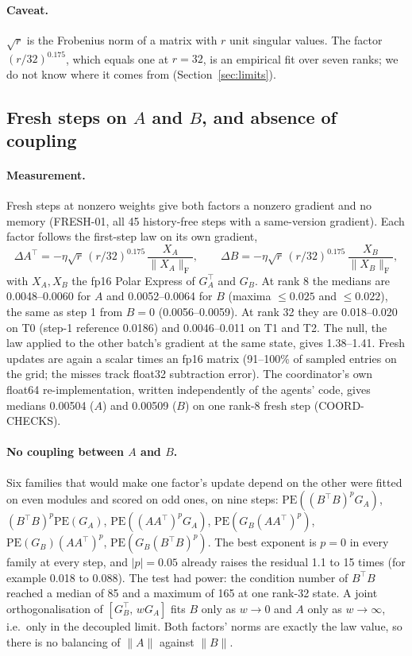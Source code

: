 \documentclass[11pt]{article}
\newcommand{\fro}{\mathrm{F}}
\newcommand{\PE}{\mathrm{PE}}
\begin{document}
\paragraph{Caveat.} $\sqrt r$ is the Frobenius norm of a matrix with $r$ unit singular values. The
factor $(r/32)^{0.175}$, which equals one at $r=32$, is an empirical fit over seven ranks; we do not
know where it comes from (Section~\ref{sec:limits}).

\subsection{\texorpdfstring{Fresh steps on $A$ and $B$, and absence of coupling}{Fresh steps on A and B, and absence of coupling}}\label{sec:ev-fresh}
\paragraph{Measurement.} Fresh steps at nonzero weights give both factors a nonzero gradient and no
memory (FRESH-01, all 45 history-free steps with a same-version gradient). Each factor follows the
first-step law on its own gradient,
\[
\Delta A^\top=-\eta\sqrt r\,(r/32)^{0.175}\,\frac{X_A}{\|X_A\|_\fro},\qquad
\Delta B=-\eta\sqrt r\,(r/32)^{0.175}\,\frac{X_B}{\|X_B\|_\fro},
\]
with $X_A,X_B$ the fp16 Polar Express of $G_A^\top$ and $G_B$. At rank 8 the medians are
0.0048--0.0060 for $A$ and 0.0052--0.0064 for $B$ (maxima $\le0.025$ and $\le0.022$), the same as
step 1 from $B=0$ (0.0056--0.0059). At rank 32 they are 0.018--0.020 on T0 (step-1 reference 0.0186)
and 0.0046--0.011 on T1 and T2. The null, the law applied to the other batch's gradient at the
same state, gives 1.38--1.41. Fresh updates are again a scalar times an fp16 matrix (91--100\% of
sampled entries on the grid; the misses track float32 subtraction error). The coordinator's own
float64 re-implementation, written independently of the agents' code, gives medians 0.00504 ($A$)
and 0.00509 ($B$) on one rank-8 fresh step (COORD-CHECKS).

\paragraph{No coupling between $A$ and $B$.} Six families that would make one factor's update depend
on the other were fitted on even modules and scored on odd ones, on nine steps:
$\PE((B^\top B)^pG_A)$, $(B^\top B)^p\PE(G_A)$, $\PE((AA^\top)^pG_A)$, $\PE(G_B(AA^\top)^p)$,
$\PE(G_B)(AA^\top)^p$, $\PE(G_B(B^\top B)^p)$. The best exponent is $p=0$ in every family at every
step, and $|p|=0.05$ already raises the residual 1.1 to 15 times (for example 0.018 to 0.088). The
test had power: the condition number of $B^\top B$ reached a median of 85 and a maximum of 165 at
one rank-32 state. A joint orthogonalisation of $[G_B^\top,\,wG_A]$ fits $B$ only as $w\to0$ and $A$ only as
$w\to\infty$, i.e.\ only in the decoupled limit. Both factors' norms are exactly the law value, so
there is no balancing of $\|A\|$ against $\|B\|$.
\end{document}
